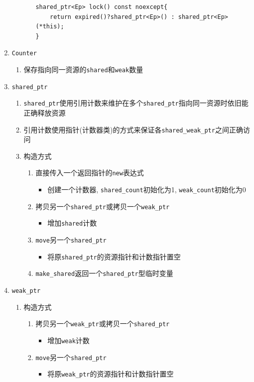 \begin{enumerate}
\begin{enumerate}
\begin{enumerate}
\begin{lstlisting}
shared_ptr<Ep> lock() const noexcept{
	return expired()?shared_ptr<Ep>() : shared_ptr<Ep>(*this);
}
			\end{lstlisting}
		\end{enumerate}
	\end{enumerate}	
	\item {\tt Counter}
	\begin{enumerate}
		\item 保存指向同一资源的{\tt shared}和{\tt weak}数量
	\end{enumerate}
	\item {\tt shared\_ptr}
	\begin{enumerate}
		\item {\tt shared\_ptr}使用引用计数来维护在多个{\tt shared\_ptr}指向同一资源时依旧能正确释放资源
		\item 引用计数使用指针(计数器类)的方式来保证各{\tt shared\_weak\_ptr}之间正确访问
		\item 构造方式
		\begin{enumerate}
			\item 直接传入一个返回指针的{\tt new}表达式
			\begin{itemize}
				\item 创建一个计数器, {\tt shared\_count}初始化为1, {\tt weak\_count}初始化为0
			\end{itemize}
			\item 拷贝另一个{\tt shared\_ptr}或拷贝一个{\tt weak\_ptr}
			\begin{itemize}
				\item 增加{\tt shared}计数
			\end{itemize}
			\item {\tt move}另一个{\tt shared\_ptr}
			\begin{itemize}
				\item 将原{\tt shared\_ptr}的资源指针和计数指针置空
			\end{itemize}
			\item {\tt make\_shared}返回一个{\tt shared\_ptr}型临时变量
		\end{enumerate}
	\end{enumerate}
	\item {\tt weak\_ptr}
	\begin{enumerate}
		\item 构造方式
		\begin{enumerate}
			\item 拷贝另一个{\tt weak\_ptr}或拷贝一个{\tt shared\_ptr}
			\begin{itemize}
				\item 增加{\tt weak}计数
			\end{itemize}
			\item {\tt move}另一个{\tt shared\_ptr}
			\begin{itemize}
				\item 将原{\tt weak\_ptr}的资源指针和计数指针置空
			\end{itemize}
		\end{enumerate}
	\end{enumerate}
\end{enumerate}

